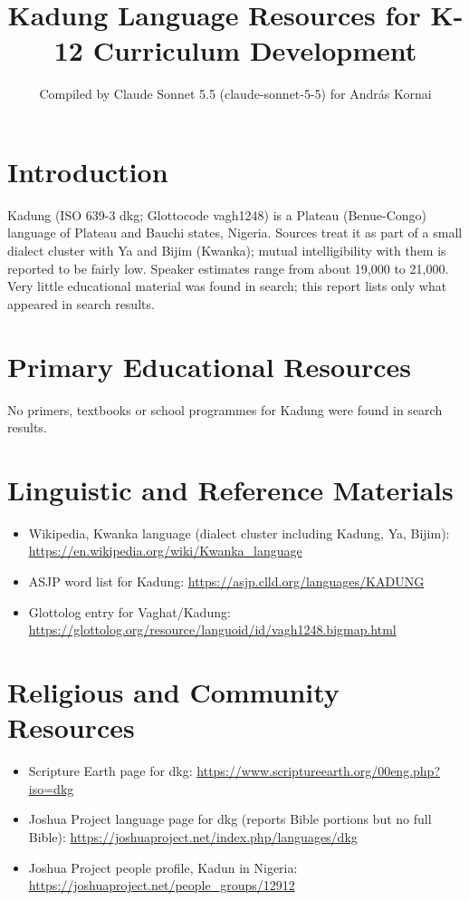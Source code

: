 \documentclass[12pt]{article}
\title{Kadung Language Resources for K-12 Curriculum Development}
\author{Compiled by Claude Sonnet 5.5 (claude-sonnet-5-5) for Andr\'as Kornai}
\date{}
\begin{document}
\maketitle

\section{Introduction}
Kadung (ISO 639-3 dkg; Glottocode vagh1248) is a Plateau (Benue-Congo) language of Plateau and Bauchi states, Nigeria. Sources treat it as part of a small dialect cluster with Ya and Bijim (Kwanka); mutual intelligibility with them is reported to be fairly low. Speaker estimates range from about 19,000 to 21,000. Very little educational material was found in search; this report lists only what appeared in search results.

\section{Primary Educational Resources}
No primers, textbooks or school programmes for Kadung were found in search results.

\section{Linguistic and Reference Materials}
\begin{itemize}
\item Wikipedia, Kwanka language (dialect cluster including Kadung, Ya, Bijim): \url{https://en.wikipedia.org/wiki/Kwanka_language}
\item ASJP word list for Kadung: \url{https://asjp.clld.org/languages/KADUNG}
\item Glottolog entry for Vaghat/Kadung: \url{https://glottolog.org/resource/languoid/id/vagh1248.bigmap.html}
\end{itemize}

\section{Religious and Community Resources}
\begin{itemize}
\item Scripture Earth page for dkg: \url{https://www.scriptureearth.org/00eng.php?iso=dkg}
\item Joshua Project language page for dkg (reports Bible portions but no full Bible): \url{https://joshuaproject.net/index.php/languages/dkg}
\item Joshua Project people profile, Kadun in Nigeria: \url{https://joshuaproject.net/people_groups/12912}
\end{itemize}
\end{document}
